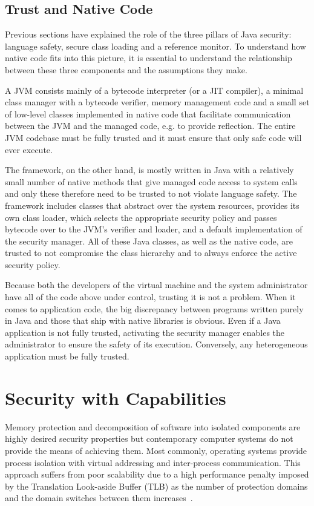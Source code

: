 \documentclass[a4paper,12pt,twoside,openright]{report}
\begin{document}
\subsection{Trust and Native Code}

Previous sections have explained the role of the three pillars of Java security: language safety, secure class loading and a reference monitor. To understand how native code fits into this picture, it is essential to understand the relationship between these three components and the assumptions they make.

A JVM consists mainly of a bytecode interpreter (or a JIT compiler), a minimal class manager with a bytecode verifier, memory management code and a small set of low-level classes implemented in native code that facilitate communication between the JVM and the managed code, e.g. to provide reflection. The entire JVM codebase must be fully trusted and it must ensure that only safe code will ever execute.

The framework, on the other hand, is mostly written in Java with a relatively small number of native methods that give managed code access to system calls and only these therefore need to be trusted to not violate language safety. The framework includes classes that abstract over the system resources, provides its own class loader, which selects the appropriate security policy and passes bytecode over to the JVM's verifier and loader, and a default implementation of the security manager. All of these Java classes, as well as the native code, are trusted to not compromise the class hierarchy and to always enforce the active security policy.

Because both the developers of the virtual machine and the system administrator have all of the code above under control, trusting it is not a problem. When it comes to application code, the big discrepancy between programs written purely in Java and those that ship with native libraries is obvious. Even if a Java application is not fully trusted, activating the security manager enables the administrator to ensure the safety of its execution. Conversely, any heterogeneous application must be fully trusted.

\section{Security with Capabilities}

Memory protection and decomposition of software into isolated components are highly desired security properties but contemporary computer systems do not provide the means of achieving them. Most commonly, operating systems provide process isolation with virtual addressing and inter-process communication. This approach suffers from poor scalability due to a high performance penalty imposed by the Translation Look-aside Buffer (TLB) as the number of protection domains and the domain switches between them increases~\cite{watson2012cheri}.
\end{document}
